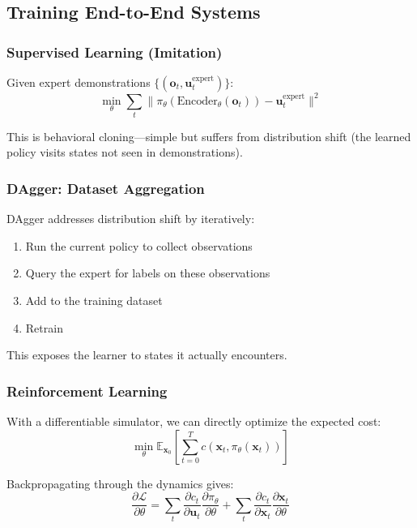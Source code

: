\subsection{Training End-to-End Systems}

\subsubsection{Supervised Learning (Imitation)}

Given expert demonstrations $\{(\mathbf{o}_t, \mathbf{u}_t^{\text{expert}})\}$:
\begin{equation}
\min_\theta \sum_t \| \pi_\theta(\text{Encoder}_\theta(\mathbf{o}_t)) - \mathbf{u}_t^{\text{expert}} \|^2
\end{equation}

This is behavioral cloning---simple but suffers from distribution shift (the learned policy visits states not seen in demonstrations).

\subsubsection{DAgger: Dataset Aggregation}

DAgger addresses distribution shift by iteratively:
\begin{enumerate}
    \item Run the current policy to collect observations
    \item Query the expert for labels on these observations
    \item Add to the training dataset
    \item Retrain
\end{enumerate}

This exposes the learner to states it actually encounters.

\subsubsection{Reinforcement Learning}

With a differentiable simulator, we can directly optimize the expected cost:
\begin{equation}
\min_\theta \mathbb{E}_{\mathbf{x}_0}\left[ \sum_{t=0}^{T} c(\mathbf{x}_t, \pi_\theta(\mathbf{x}_t)) \right]
\end{equation}

Backpropagating through the dynamics gives:
\begin{equation}
\frac{\partial \mathcal{L}}{\partial \theta} = \sum_t \frac{\partial c_t}{\partial \mathbf{u}_t} \frac{\partial \pi_\theta}{\partial \theta} + \sum_t \frac{\partial c_t}{\partial \mathbf{x}_t} \frac{\partial \mathbf{x}_t}{\partial \theta}
\end{equation}

